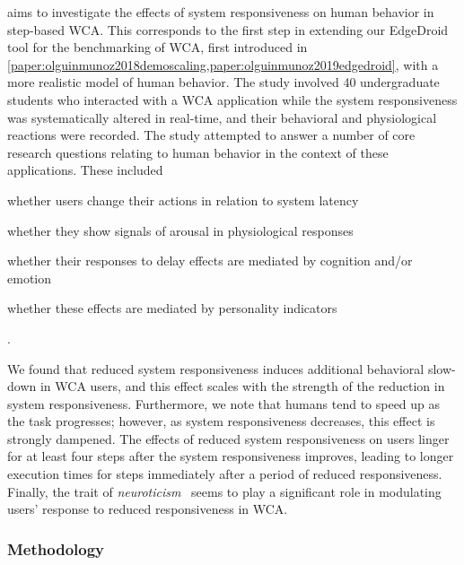  aims to investigate the effects of system responsiveness on human behavior in step-based \gls{WCA}.
This corresponds to the first step in extending our EdgeDroid tool for the benchmarking of \gls{WCA}, first introduced in \cref{paper:olguinmunoz2018demoscaling,paper:olguinmunoz2019edgedroid}, with a more realistic model of human behavior.
The study involved \num{40} undergraduate students who interacted with a \gls{WCA} application while the system responsiveness was systematically altered in real-time, and their behavioral and physiological reactions were recorded.
The study attempted to answer a number of core research questions relating to human behavior in the context of these applications.
These included
\begin{inlineenum}
    \item whether users change their actions in relation to system latency
    \item whether they show signals of arousal in physiological responses
    \item whether their responses to delay effects are mediated by cognition and/or emotion
    \item whether these effects are mediated by personality indicators
\end{inlineenum}.

We found that reduced system responsiveness induces additional behavioral slow-down in \gls{WCA} users, and this effect scales with the strength of the reduction in system responsiveness.
Furthermore, we note that humans tend to speed up as the task progresses;
however, as system responsiveness decreases, this effect is strongly dampened.
The effects of reduced system responsiveness on users linger for at least four steps after the system responsiveness improves, leading to longer execution times for steps immediately after a period of reduced responsiveness.
Finally, the trait of \emph{neuroticism}~\cite{john1999big} seems to play a significant role in modulating users' response to reduced responsiveness in \gls{WCA}.

\subsubsection{Methodology}

